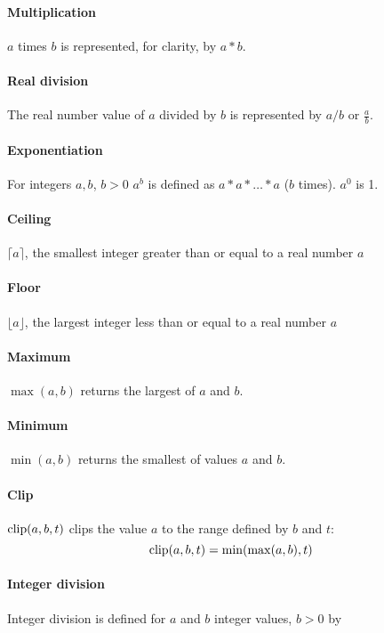 \paragraph*{Multiplication} $a$ times $b$ is represented, for clarity, by $a*b$.

\paragraph*{Real division} The real number value of $a$ divided by $b$ is represented by $a/b$ or $\frac{a}{b}$.

\paragraph*{Exponentiation} For integers $a, b$, $b>0$ $a^b$ is defined as $a*a*\hdots *a$ ($b$ times). $a^0$ is 1.

\paragraph*{Ceiling} $\lceil a \rceil$, the smallest integer greater than or equal to a real number $a$

\paragraph*{Floor} $\lfloor a \rfloor$, the largest integer less than or equal to a real number $a$

\paragraph*{Maximum} $\max(a,b)$ returns the largest of $a$ and $b$.

\paragraph*{Minimum} $\min(a,b)$ returns the smallest of values $a$ and $b$.

\paragraph*{Clip} $\operatorname{clip}(a,b,t)$ clips the value $a$ to the range defined by $b$ and $t$:
\[\operatorname{clip}(a,b,t)=\min(\max(a,b),t)\]

\paragraph*{Integer division} Integer division is defined for $a$ and $b$ integer values, $b>0$ by

